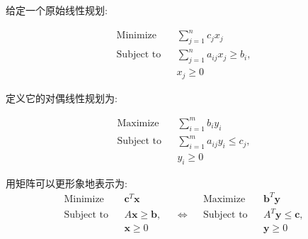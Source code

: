 给定一个原始线性规划:

$$
\begin{aligned}
\text{Minimize}&&\sum_{j=1}^n c_j x_j\\
\text{Subject to}&&\sum_{j=1}^n a_{ij} x_j\ge b_i,\\
&&x_j\ge 0
\end{aligned}
$$

定义它的对偶线性规划为:

$$
\begin{aligned}
\text{Maximize}&&\sum_{i=1}^m b_i y_i\\
\text{Subject to}&&\sum_{i=1}^m a_{ij} y_i\le c_j,\\
&&y_i\ge 0
\end{aligned}
$$

用矩阵可以更形象地表示为:
$$
\begin{aligned}
\text{Minimize}&& \mathbf c^T \mathbf x &&&& \text{Maximize} && \mathbf b^{T}\mathbf y\\
\text{Subject to}&& A\mathbf x \ge \mathbf b, && \Longleftrightarrow && \text{Subject to} && A^T\mathbf y \le \mathbf c,\\
&& \mathbf x\ge 0 &&&&&& \mathbf y\ge 0
\end{aligned}
$$
